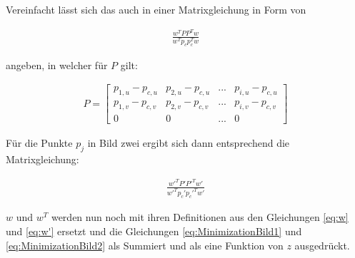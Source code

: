 %

Vereinfacht lässt sich das auch in einer Matrixgleichung in Form von

\begin{gather}
	\frac{w^TPP^Tw}{w^Tp_cp_c^Tw} \label{eq:MinimizationBild1}
\end{gather}

angeben, in welcher für $P$ gilt:

\begin{gather}
	P=\begin{bmatrix}
		p_{1,u}-p_{c,u}&p_{2,u}-p_{c,u}&...&p_{i,u}-p_{c,u}\\
		p_{1,v}-p_{c,v}&p_{2,v}-p_{c,v}&...&p_{i,v}-p_{c,v}\\\label{eq:P}
		0&0&...&0	
	\end{bmatrix}
\end{gather}

Für die Punkte $p_j$ in Bild zwei ergibt sich dann entsprechend die Matrixgleichung:

\begin{gather}
	\frac{w'^TP'P'^Tw'}{w'^Tp_c'p_c'^Tw'}\label{eq:MinimizationBild2}
\end{gather} 


$w$ und $w^T$ werden nun noch mit ihren Definitionen aus den Gleichungen \ref{eq:w} und \ref{eq:w'} ersetzt und die Gleichungen \ref{eq:MinimizationBild1} und \ref{eq:MinimizationBild2} als Summiert und als eine Funktion von $z$ ausgedrückt\cite{ZZ}. 


